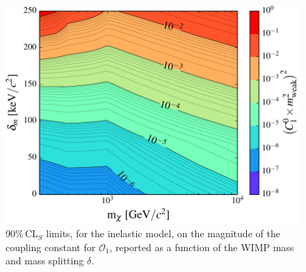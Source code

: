 \begin{figure}
\centerline{\includegraphics[width=1.\linewidth]{Figures/O1_inelastic_lim_2D}}
\caption{90\%\,CL$_S$ limits, for the inelastic model, on the magnitude of the coupling constant for $\mathcal{O}_1$, reported as a function of the WIMP mass and mass splitting $\delta$.}
\label{fig:O1Inel}
\end{figure}  


